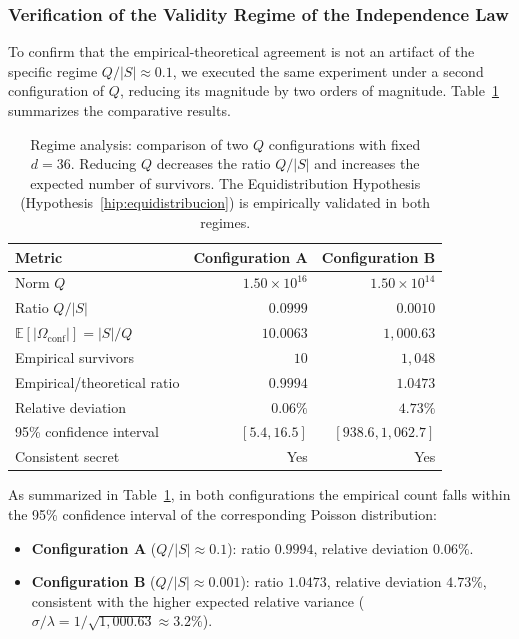 \documentclass[11pt,a4paper]{article}
\theoremstyle{plain}
\theoremstyle{definition}
\numberwithin{equation}{section}
\newcommand{\E}{\mathbb{E}}
\begin{document}
\subsubsection{Verification of the Validity Regime of the Independence Law}
\label{subsubsec:regimen_validez}

To confirm that the empirical-theoretical agreement is not an artifact of the specific regime $Q/|S| \approx 0.1$, we executed the same experiment under a second configuration of $Q$, reducing its magnitude by two orders of magnitude. Table~\ref{tab:regimen_analysis} summarizes the comparative results.

\begin{table}[htbp]
\centering
\caption{Regime analysis: comparison of two $Q$ configurations with fixed $d=36$. Reducing $Q$ decreases the ratio $Q/|S|$ and increases the expected number of survivors. The Equidistribution Hypothesis (Hypothesis~\ref{hip:equidistribucion}) is empirically validated in both regimes.}
\label{tab:regimen_analysis}
\small
\begin{tabular}{l r r}
\toprule
\textbf{Metric} & \textbf{Configuration A} & \textbf{Configuration B} \\
\midrule
Norm $Q$ & $1.50 \times 10^{16}$ & $1.50 \times 10^{14}$ \\
Ratio $Q/|S|$ & $0.0999$ & $0.0010$ \\
$\E[|\Omega_{\text{conf}}|] = |S|/Q$ & $10.0063$ & $1{,}000.63$ \\
Empirical survivors & $10$ & $1{,}048$ \\
Empirical/theoretical ratio & $0.9994$ & $1.0473$ \\
Relative deviation & $0.06\%$ & $4.73\%$ \\
95\% confidence interval & $[5.4, 16.5]$ & $[938.6, 1{,}062.7]$ \\
Consistent secret & Yes & Yes \\
\bottomrule
\end{tabular}
\end{table}

As summarized in Table~\ref{tab:regimen_analysis}, in both configurations the empirical count falls within the 95\% confidence interval of the corresponding Poisson distribution:

\begin{itemize}
    \item \textbf{Configuration A} ($Q/|S| \approx 0.1$): ratio $0.9994$, relative deviation $0.06\%$.
    \item \textbf{Configuration B} ($Q/|S| \approx 0.001$): ratio $1.0473$, relative deviation $4.73\%$, consistent with the higher expected relative variance ($\sigma/\lambda = 1/\sqrt{1{,}000.63} \approx 3.2\%$).
\end{itemize}
\end{document}

